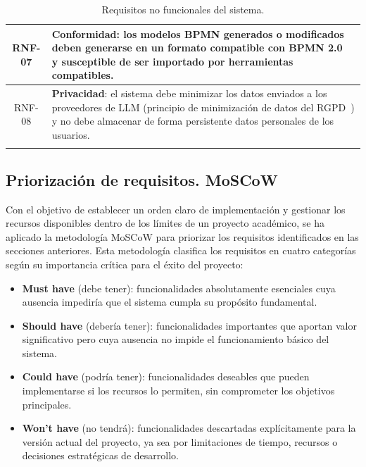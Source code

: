 {\begin{longtable}{|c|p{11.5cm}|}
RNF-07 & \textbf{Conformidad}: los modelos BPMN generados o modificados deben generarse en un formato compatible con BPMN 2.0~\cite{omg2011bpmn} y susceptible de ser importado por herramientas compatibles. \\
\hline
RNF-08 & \textbf{Privacidad}: el sistema debe minimizar los datos enviados a los proveedores de LLM (principio de minimización de datos del RGPD~\cite{rgpd2016}) y no debe almacenar de forma persistente datos personales de los usuarios. \\
\hline
\caption{Requisitos no funcionales del sistema.}
\label{tab:requisitosNoFuncionales}
\end{longtable}


\subsection{Priorización de requisitos. MoSCoW}
\label{subsec:priorizacion}

Con el objetivo de establecer un orden claro de implementación y gestionar los recursos disponibles dentro de los límites de un proyecto académico, se ha aplicado la metodología MoSCoW para priorizar los requisitos identificados en las secciones anteriores. Esta metodología clasifica los requisitos en cuatro categorías según su importancia crítica para el éxito del proyecto:

\begin{itemize}
    \item[$\bullet$] \textbf{Must have} (debe tener): funcionalidades absolutamente esenciales cuya ausencia impediría que el sistema cumpla su propósito fundamental.
    \item[$\bullet$] \textbf{Should have} (debería tener): funcionalidades importantes que aportan valor significativo pero cuya ausencia no impide el funcionamiento básico del sistema.
    \item[$\bullet$] \textbf{Could have} (podría tener): funcionalidades deseables que pueden implementarse si los recursos lo permiten, sin comprometer los objetivos principales.
    \item[$\bullet$] \textbf{Won't have} (no tendrá): funcionalidades descartadas explícitamente para la versión actual del proyecto, ya sea por limitaciones de tiempo, recursos o decisiones estratégicas de desarrollo.
\end{itemize}

}
